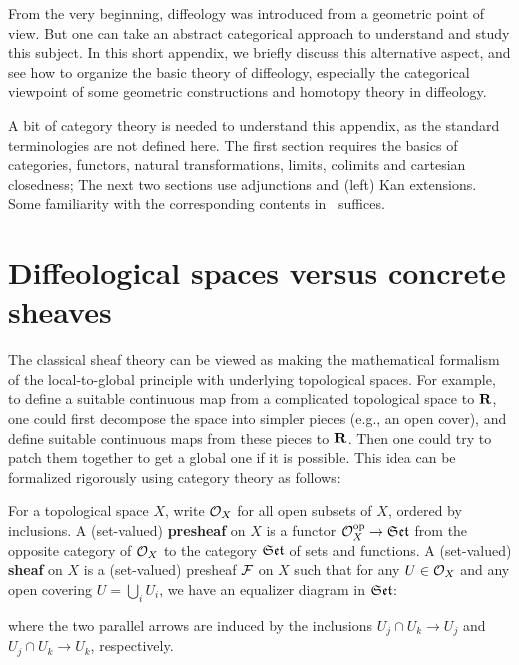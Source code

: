 \bigskip
From the very beginning,
diffeology was introduced from a geometric point of view.
But one can take an abstract categorical approach to understand and study this subject.
In this short appendix,
we briefly discuss this alternative aspect,
and see how to organize the basic theory of diffeology,
especially the categorical viewpoint of some geometric constructions and homotopy theory in diffeology.

A bit of category theory is needed to understand this appendix,
as the standard terminologies are not defined here.
The first section requires the basics of categories,
functors,
natural transformations,
limits,
colimits and cartesian closedness;
The next two sections use adjunctions and (left) Kan extensions.
Some familiarity with the corresponding contents in~\cite{McL71} suffices.

\section*{Diffeological spaces versus concrete sheaves}

The classical sheaf theory can be viewed as making the mathematical formalism of the local-to-global principle with underlying topological spaces.
For example, to define a suitable continuous map from a complicated topological space to $\mathbf{R}$,
one could first decompose the space into simpler pieces (e.g., an open cover),
and define suitable continuous maps from these pieces to $\mathbf{R}$.
Then one could try to patch them together to get a global one if it is possible.
This idea can be formalized rigorously using category theory as follows:

\begin{definition}
  For a topological space $X$,
  write $\mathcal{O}_X$ for all open subsets of $X$,
  ordered by inclusions.
  A (set-valued) \textbf{presheaf} on $X$ is a functor $\mathcal{O}_X^{\mathrm{op}} \to \mathfrak{Set}$ from the opposite category of $\mathcal{O}_X$ to the category $\mathfrak{Set}$ of sets and functions.
  A (set-valued) \textbf{sheaf} on $X$ is a (set-valued) presheaf $\mathcal{F}$ on $X$ such that for any $U \in \mathcal{O}_X$ and any open covering $U = \bigcup_i U_i$,
  we have an equalizer diagram in $\mathfrak{Set}$:
  \begin{center}
  \end{center}
  where the two parallel arrows are induced by the inclusions $U_j \cap U_k \to U_j$ and $U_j \cap U_k \to U_k$,
  respectively.
\end{definition}

